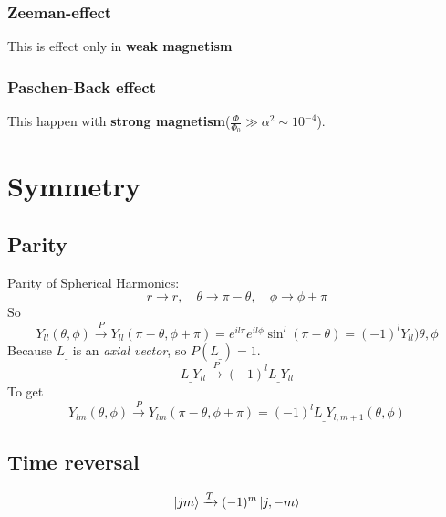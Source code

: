 \subsubsection{Zeeman-effect}
This is effect only in \textbf{weak magnetism}

\subsubsection{Paschen-Back effect}
This happen with \textbf{strong magnetism}($\frac{\Phi}{\Phi_0}\gg\alpha^2\sim10^{-4}$).


\section{Symmetry}

\subsection{Parity} 
Parity of Spherical Harmonics:
\[
    r\rightarrow{}r,\quad\theta\rightarrow\pi-\theta,\quad\phi\rightarrow\phi+\pi
    \]
So
\[
    Y_{ll}(\theta,\phi)\xrightarrow{P}Y_{ll}(\pi-\theta,\phi+\pi)=e^{il\pi}e^{il\phi}\sin^l(\pi-\theta)=(-1)^{l}Y_{ll})\theta,\phi
    \]
Because $L_\_$ is an \emph{axial vector}, so $P(L_\_)=1$.
\[
    L_\_Y_{ll}\xrightarrow{P}(-1)^{l}L_\_Y_{ll}
    \]
To get
\[
    Y_{lm}(\theta,\phi)\xrightarrow{P}Y_{lm}(\pi-\theta,\phi+\pi)=(-1)^{l}L_\_Y_{l,m+1}(\theta,\phi)
    \]

\subsection{Time reversal}
\[
    \ket{jm}\xrightarrow{T}(-1)^m\ket{j,-m}
    \]

